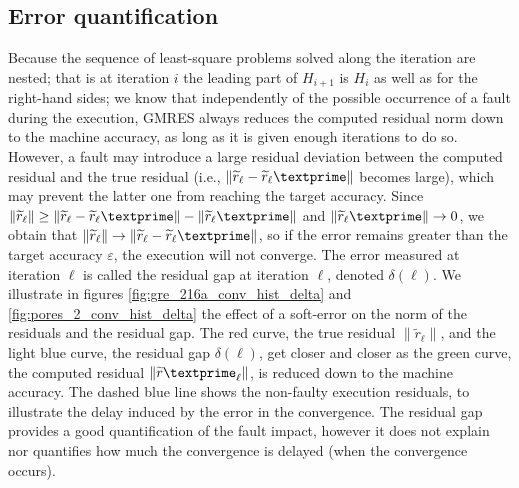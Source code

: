 \subsection{Error quantification}\label{sec:quantify}
Because the sequence of least-square problems solved along the iteration are nested; that is at iteration $i$ 
the leading part of $H_{i+1}$ is $H_i$ as well as for the right-hand sides; we know that independently of the possible occurrence of a fault during the execution, GMRES always reduces the computed residual norm down to the machine accuracy, as long as it is given enough iterations to do so. However, a fault may introduce a large residual deviation between the computed residual and the true residual (i.e., $\|\widetilde{r}_{\ell} - \widetilde{r}_{\ell}\textprime \|$ becomes large), which may prevent the latter one from reaching the target accuracy. Since $ \|\widetilde{r}_{\ell}\| \geq \|\widetilde{r}_{\ell} - \widetilde{r}_{\ell}\textprime \| - \| \widetilde{r}_{\ell}\textprime \|$ and $\|\widetilde{r}_\ell\textprime \| \rightarrow 0$, we obtain that $\|\widetilde{r}_{\ell}\| \rightarrow \|\widetilde{r}_{\ell} - \widetilde{r}_\ell\textprime \|$, so if the error remains greater than the target accuracy $\varepsilon$, the execution will not converge. The error measured at iteration $\ell$ is called the residual gap at iteration $\ell$, denoted $\delta(\ell)$.
We illustrate in figures \ref{fig:gre_216a_conv_hist_delta} and \ref{fig:pores_2_conv_hist_delta} the effect of a soft-error on the norm of the residuals and the residual gap.
The red curve, the true residual $\|\widetilde{r}_{\ell}\|$, and the light blue curve, the residual gap $\delta(\ell)$, get closer and closer as the green curve, the computed residual $\|\widetilde{r}\textprime_{\ell}\|$, is reduced down to the machine accuracy.
The dashed blue line shows the non-faulty execution residuals, to illustrate the delay induced by the error in the convergence.
The residual gap provides a good quantification of the fault impact, however it does not explain nor quantifies how much the convergence is delayed (when the convergence occurs).




